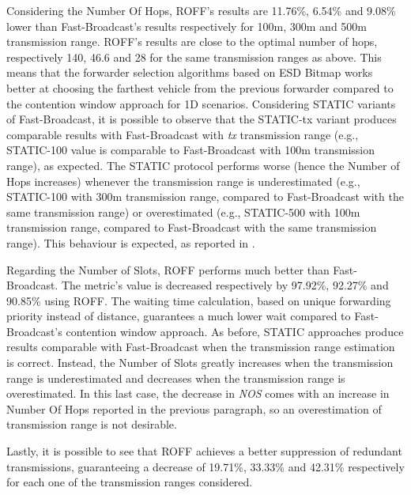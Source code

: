 		
		Considering the Number Of Hops, ROFF's results are 11.76\%, 6.54\% and 9.08\% lower than Fast-Broadcast's results respectively for 100m, 300m and 500m transmission range. ROFF's results are close to the optimal number of hops, respectively 140, 46.6 and 28 for the same transmission ranges as above. This means that the forwarder selection algorithms based on ESD Bitmap works better at choosing the farthest vehicle from the previous forwarder compared to the contention window approach for 1D scenarios. Considering STATIC variants of Fast-Broadcast, it is possible to observe that the STATIC-tx variant produces comparable results with Fast-Broadcast with \textit{tx} transmission range (e.g., STATIC-100 value is comparable to Fast-Broadcast with 100m transmission range), as expected. The STATIC protocol performs worse (hence the Number of Hops increases) whenever the transmission range is underestimated (e.g., STATIC-100 with 300m transmission range, compared to Fast-Broadcast with the same transmission range) or overestimated (e.g., STATIC-500 with 100m transmission range, compared to Fast-Broadcast with the same transmission range). This behaviour is expected, as reported in \cite{BAR2017}.
		
		
		Regarding the Number of Slots, ROFF performs much better than Fast-Broadcast. The metric's value is decreased respectively by 97.92\%, 92.27\% and 90.85\% using ROFF. The waiting time calculation, based on unique forwarding priority instead of distance, guarantees a much lower wait compared to Fast-Broadcast's contention window approach. As before, STATIC approaches produce results comparable with Fast-Broadcast when the transmission range estimation is correct. Instead, the Number of Slots greatly increases when the transmission range is underestimated and decreases when the transmission range is overestimated. In this last case, the decrease in \textit{NOS} comes with an increase in Number Of Hops reported in the previous paragraph, so an overestimation of transmission range is not desirable.
		
		
		Lastly, it is possible to see that ROFF achieves a better suppression of redundant transmissions, guaranteeing a decrease of 19.71\%, 33.33\% and 42.31\% respectively for each one of the transmission ranges considered.
		
		

